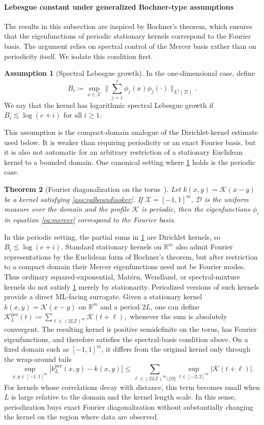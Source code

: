 \documentclass{article}
\let\cite\citep
\newtheorem{theorem}{Theorem}
\numberwithin{theorem}{section}
\theoremstyle{definition}
\newtheorem{ass}[theorem]{Assumption}
\newcommand{\inpdist}{\Ds}
\newcommand{\Ds}{\mathcal D}
\newcommand{\Xs}{\mathcal X}
\begin{document}
\paragraph{Lebesgue constant under generalized Bochner-type assumptions}
The results in this subsection are inspired by Bochner's theorem, which ensures that the eigenfunctions of periodic stationary kernels correspond to the Fourier basis. The argument relies on spectral control of the Mercer basis rather than on periodicity itself. We isolate this condition first.
\begin{ass}[Spectral Lebesgue growth]\label{ass:spectrallebesgue}
    In the one-dimensional case, define
    $$B_i\coloneqq \sup_{x\in \Xs}\bigg\|\sum_{j=1}^i\phi_j(x)\phi_j(\cdot)\bigg\|_{L^1(\inpdist)}.$$
    We say that the kernel has logarithmic spectral Lebesgue growth if $B_i\lesssim \log(e+i)$ for all $i\ge 1$.
\end{ass}
This assumption is the compact-domain analogue of the Dirichlet-kernel estimate used below. It is weaker than requiring periodicity or an exact Fourier basis, but it is also not automatic for an arbitrary restriction of a stationary Euclidean kernel to a bounded domain.
One canonical setting where \cref{ass:spectrallebesgue} holds is the periodic case.
\begin{theorem}[Fourier diagonalization on the torus~\cite{seeger2004gaussian}]\label{thm:boch}
    Let $k(x,y)=\mathscr K(x-y)$ be a kernel satisfying \cref{ass:valboundisoker}. If $\Xs=[-1,1]^m$, $\inpdist$ is the uniform measure over the domain and the profile $\mathscr K$ is periodic,
    then the eigenfunctions $\phi_i$ in equation \eqref{eq:mercer} correspond to the Fourier basis.
\end{theorem}
In this periodic setting, the partial sums in \cref{ass:spectrallebesgue} are Dirichlet kernels, so $B_i\lesssim \log(e+i)$. Standard stationary kernels on $\mathbb R^m$ also admit Fourier representations by the Euclidean form of Bochner's theorem, but after restriction to a compact domain their Mercer eigenfunctions need not be Fourier modes. Thus ordinary squared-exponential, Mat\'ern, Wendland, or spectral-mixture kernels do not satisfy \cref{ass:spectrallebesgue} merely by stationarity.
Periodized versions of such kernels provide a direct ML-facing surrogate. Given a stationary kernel $k(x,y)=\mathscr K(x-y)$ on $\mathbb R^m$ and a period $2L$, one can define
$\mathscr K_L^{\mathrm{per}}(t)\coloneqq \sum_{\ell\in (2L\mathbb Z)^m}\mathscr K(t+\ell),$
whenever the sum is absolutely convergent. The resulting kernel is positive semidefinite on the torus, has Fourier eigenfunctions, and therefore satisfies the spectral-basis condition above. On a fixed domain such as $[-1,1]^m$, it differs from the original kernel only through the wrap-around tails
$$\sup_{x,y\in[-1,1]^m}|k_L^{\mathrm{per}}(x,y)-k(x,y)|\le \sum_{\ell\in(2L\mathbb Z)^m\setminus\{0\}}\sup_{t\in[-2,2]^m}|\mathscr K(t+\ell)|.$$
For kernels whose correlations decay with distance, this term becomes small when $L$ is large relative to the domain and the kernel length scale. In this sense, periodization buys exact Fourier diagonalization without substantially changing the kernel on the region where data are observed.
\end{document}
